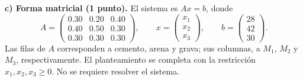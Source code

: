 \documentclass[10pt,a4]{examenEPN0}
\begin{document}
\noindent\textbf{c) Forma matricial (1 punto).}
El sistema es $Ax=b$, donde
\[
    \boxed{
    A=\begin{pmatrix}
        0.30&0.20&0.40\\
        0.40&0.50&0.30\\
        0.30&0.30&0.30
    \end{pmatrix},\qquad
    x=\begin{pmatrix}x_1\\x_2\\x_3\end{pmatrix},\qquad
    b=\begin{pmatrix}28\\42\\30\end{pmatrix}.}
\]
Las filas de $A$ corresponden a cemento, arena y grava; sus columnas,
a $M_1$, $M_2$ y $M_3$, respectivamente. El planteamiento se completa con
la restricción $x_1,x_2,x_3\ge0$. No se requiere resolver el sistema.
\end{document}
